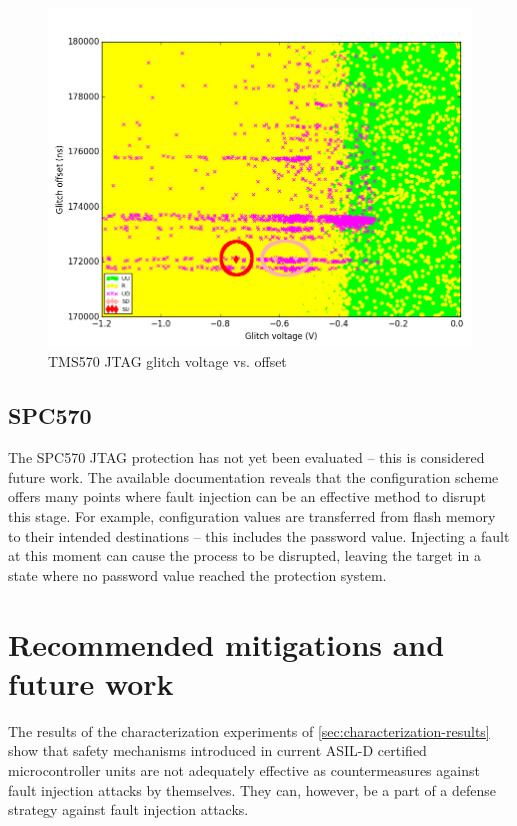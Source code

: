 \documentclass[10pt]{article}
\newcommand{\TI}{TMS570\xspace}
\newcommand{\ST}{SPC570\xspace}
\newcommand{\jtag}{JTAG\xspace}
\begin{document}
    \begin{figure}[H]
      \centering
      \includegraphics[width=\textwidth]{../plots/newplots/ti-jtag-voltage-offset.png}
      \caption{\TI \jtag glitch voltage vs. offset}
      \label{fig:ti-jtag-voltage-offset}
    \end{figure}

  \subsection{\ST}

    The \ST JTAG protection has not yet been evaluated -- this is considered future work. The available documentation reveals that the configuration scheme offers many points where fault injection can be an effective method to disrupt this stage. For example, configuration values are transferred from flash memory to their intended destinations -- this includes the password value. Injecting a fault at this moment can cause the process to be disrupted, leaving the target in a state where no password value reached the protection system.

\newpage
\section{Recommended mitigations and future work}
\label{sec:mitigations+futurwork}

  The results of the characterization experiments of \autoref{sec:characterization-results} show that safety mechanisms introduced in current ASIL-D certified microcontroller units are not adequately effective as countermeasures against fault injection attacks by themselves. They can, however, be a part of a defense strategy against fault injection attacks. 
\end{document}
